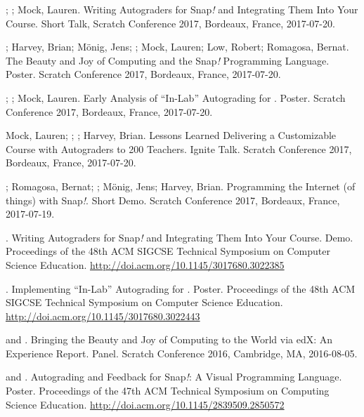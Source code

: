 \begin{etaremune}
    \item{\me; \dan; Mock, Lauren. Writing Autograders for Snap\textit{!} and Integrating Them Into Your Course. Short Talk, Scratch Conference 2017, Bordeaux, France, 2017-07-20.}

    \item{\dan; Harvey, Brian; Mönig, Jens; \me; Mock, Lauren; Low, Robert; Romagosa, Bernat. The Beauty and Joy of Computing and the Snap\textit{!} Programming Language. Poster. Scratch Conference 2017, Bordeaux, France, 2017-07-20.}

    \item{\me; \dan; Mock, Lauren. Early Analysis of ``In-Lab'' Autograding for \snap. Poster. Scratch Conference 2017, Bordeaux, France, 2017-07-20.}

    \item{Mock, Lauren; \me; \dan; Harvey, Brian. Lessons Learned Delivering a Customizable Course with Autograders to 200 Teachers. Ignite Talk. Scratch Conference 2017, Bordeaux, France, 2017-07-20.}
    
    \item{\dan; Romagosa, Bernat; \me; Mönig, Jens; Harvey, Brian. Programming the Internet (of things) with Snap\textit{!}. Short Demo. Scratch Conference 2017, Bordeaux, France, 2017-07-19.}

    \item{\me. Writing Autograders for Snap\textit{!} and Integrating Them Into Your Course. Demo. Proceedings of the 48th ACM SIGCSE Technical Symposium on Computer Science Education.} \href{http://doi.acm.org/10.1145/3017680.3022385}{http://doi.acm.org/10.1145/3017680.3022385}

    \item{\me. Implementing ``In-Lab'' Autograding for \snap. Poster. Proceedings of the 48th ACM SIGCSE Technical Symposium on Computer Science Education.} \newline\href{http://doi.acm.org/10.1145/3017680.3022443}{http://doi.acm.org/10.1145/3017680.3022443}
    

    \item{\dan and \me. Bringing the Beauty and Joy of Computing to the World via edX: An Experience Report. Panel. Scratch Conference 2016, Cambridge, MA, 2016-08-05.}

    \item{\me and \dan. Autograding and Feedback for Snap\textit{!}: A Visual Programming Language. Poster. Proceedings of the 47th ACM Technical Symposium on Computing Science Education.}
    \href{http://doi.acm.org/10.1145/2839509.2850572}{http://doi.acm.org/10.1145/2839509.2850572}


\end{etaremune}
